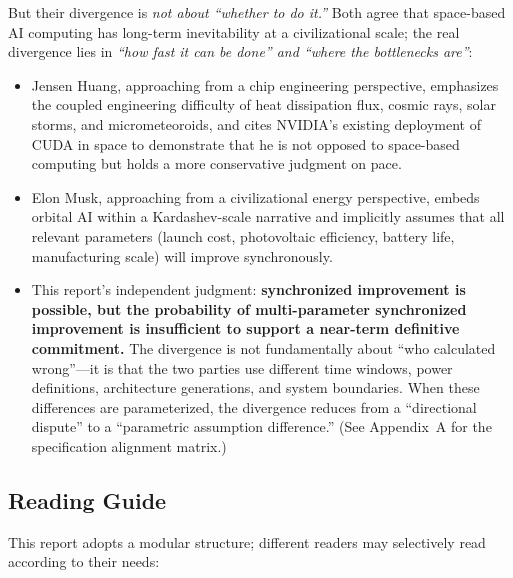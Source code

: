 But their divergence is \emph{not about ``whether to do it.''} Both agree that space-based AI computing has long-term inevitability at a civilizational scale; the real divergence lies in \emph{``how fast it can be done'' and ``where the bottlenecks are''}:

\begin{itemize}[leftmargin=*]
    \item Jensen Huang, approaching from a chip engineering perspective, emphasizes the coupled engineering difficulty of heat dissipation flux, cosmic rays, solar storms, and micrometeoroids, and cites NVIDIA's existing deployment of CUDA in space to demonstrate that he is not opposed to space-based computing but holds a more conservative judgment on pace.
    \item Elon Musk, approaching from a civilizational energy perspective, embeds orbital AI within a Kardashev-scale narrative and implicitly assumes that all relevant parameters (launch cost, photovoltaic efficiency, battery life, manufacturing scale) will improve synchronously.
    \item This report's independent judgment: \textbf{synchronized improvement is possible, but the probability of multi-parameter synchronized improvement is insufficient to support a near-term definitive commitment.} The divergence is not fundamentally about ``who calculated wrong''---it is that the two parties use different time windows, power definitions, architecture generations, and system boundaries. When these differences are parameterized, the divergence reduces from a ``directional dispute'' to a ``parametric assumption difference.'' (See Appendix~A for the specification alignment matrix.)
\end{itemize}

\subsection*{Reading Guide}

This report adopts a modular structure; different readers may selectively read according to their needs:

